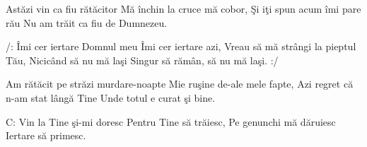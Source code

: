 
\beginverse
Astăzi vin ca fiu rătăcitor
Mă închin la cruce mă cobor,
Şi iţi spun acum îmi pare rău
Nu am trăit ca fiu de Dumnezeu.
\endverse

\beginchorus
/: Îmi cer iertare Domnul meu
Îmi cer iertare azi,
Vreau să mă strângi la pieptul Tău,
Nicicând să nu mă laşi
Singur să rămân, să nu mă laşi. :/
\endchorus

\beginverse
Am rătăcit pe străzi murdare-noapte
Mie ruşine de-ale mele fapte,
Azi regret că n-am stat lângă Tine
Unde totul e curat şi bine.
\endverse

\beginverse*
C: Vin la Tine şi-mi doresc 
Pentru Tine să trăiesc,
Pe genunchi mă dăruiesc
Iertare să primesc.
\endverse

\endsong